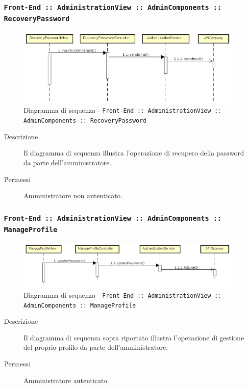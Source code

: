 \documentclass[../DefinizioneDiProdotto_v3.0.0.tex]{subfiles}
\begin{document}
\newpage
\subsubsection{\texttt{Front-End :: AdministrationView :: AdminComponents :: RecoveryPassword}}
\begin{figure}[!h]
	\centering
	\includegraphics[width=\textwidth]{DiagrammiSequenza/Front-End/AdministrationView/RecoveryPassword.png}
	\caption{Diagramma di sequenza - \texttt{Front-End :: AdministrationView :: AdminComponents :: RecoveryPassword}}
\end{figure}
\begin{description}
	\item [Descrizione] Il diagramma di sequenza illustra l'operazione di recupero della password da parte dell'amministratore.
	\item [Permessi] Amministratore non autenticato.
\end{description}

\subsubsection{\texttt{Front-End :: AdministrationView :: AdminComponents :: ManageProfile}}
\begin{figure}[!h]
	\centering
	\includegraphics[width=\textwidth]{DiagrammiSequenza/Front-End/AdministrationView/ManageProfile.png}
	\caption{Diagramma di sequenza - \texttt{Front-End :: AdministrationView :: AdminComponents :: ManageProfile }}
\end{figure}
\begin{description}
	\item [Descrizione] Il diagramma di sequenza sopra riportato illustra l'operazione di gestione del proprio profilo da parte dell'amministratore.
	\item [Permessi] Amministratore autenticato.
\end{description}
\end{document}

